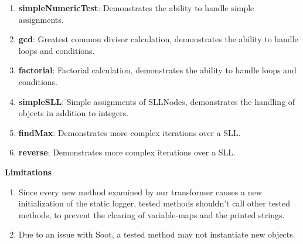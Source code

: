\documentclass[10pt]{article}
\begin{document}
\begin{enumerate}
\item \textbf{simpleNumericTest}: Demonstrates the ability to handle simple assignments.
\item \textbf{gcd}: Greatest common divisor calculation, demonstrates the ability to
handle loops and conditions.
\item \textbf{factorial}: Factorial calculation, demonstrates the ability to handle loops and conditions.
\item \textbf{simpleSLL}: Simple assignments of SLLNodes, demonstrates the handling of objects in addition to integers.
\item \textbf{findMax}: Demonstrates more complex iterations over a SLL.
\item \textbf{reverse}: Demonstrates more complex iterations over a SLL.
\end{enumerate}    
\textbf{Limitations} \\
\begin{enumerate}
\item Since every new method examined by our transformer causes a new initialization of the static logger, tested methods shouldn't call other tested methods, to prevent the clearing of variable-maps and the printed strings.
\item Due to an issue with Soot, a tested method may not instantiate new objects.
\end{enumerate}    

\begin{center}
\end{center}
\end{document}
